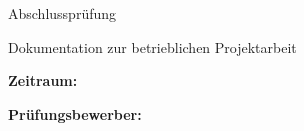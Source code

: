 
\begin{figure}[htbp]
	\centering
	
\end{figure}

\begin{center}
	\fontsize{14pt}{16pt}\selectfont

	Abschlussprüfung\
	\abschlusspruefungSaison\
	\abschlusspruefungJahr
\end{center}

\vspace{10pt}


\begin{center}
	\fontsize{14pt}{16pt}\selectfont
	\ausbildung
\end{center}

\begin{center}
	\fontsize{14pt}{16pt}\selectfont
	Dokumentation zur betrieblichen Projektarbeit
\end{center}


\vspace{16pt}


\begin{center}
	\fontsize{20pt}{20pt}\selectfont

	\textbf{\projektname}
\end{center}

\begin{center}
	\fontsize{14pt}{14pt}\selectfont

	\projektkurzbeschreibung
\end{center}




\vspace{16pt}


\begin{center}
	\fontsize{12pt}{12pt}\selectfont

	\textbf{Zeitraum: \pruefungsZeitraum}
\end{center}

	

\vspace{16pt}


\begin{center}
	\fontsize{12pt}{12pt}\selectfont

	\textbf{Prüfungsbewerber:}
\end{center}

\begin{center}
	\fontsize{12pt}{16pt}\selectfont
	\pruefungsbewerberVorname\
	\pruefungsbewerberNachname
	\\
	\pruefungsbewerberAdresse
	\\
	\pruefungsbewerberPLZ\
	\pruefungsbewerberStadt
\end{center}

